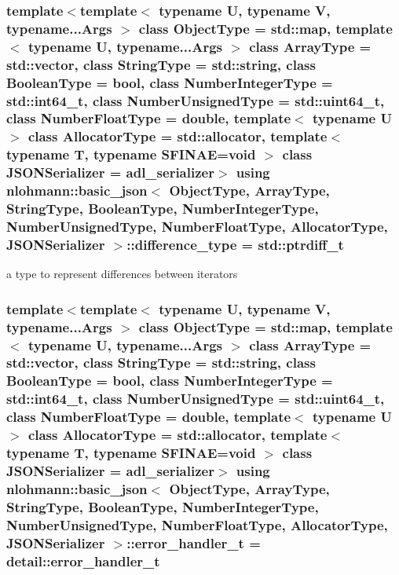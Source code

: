 \subsubsection[{\texorpdfstring{difference\+\_\+type}{difference_type}}]{\setlength{\rightskip}{0pt plus 5cm}template$<$template$<$ typename U, typename V, typename...\+Args $>$ class Object\+Type = std\+::map, template$<$ typename U, typename...\+Args $>$ class Array\+Type = std\+::vector, class String\+Type  = std\+::string, class Boolean\+Type  = bool, class Number\+Integer\+Type  = std\+::int64\+\_\+t, class Number\+Unsigned\+Type  = std\+::uint64\+\_\+t, class Number\+Float\+Type  = double, template$<$ typename U $>$ class Allocator\+Type = std\+::allocator, template$<$ typename T, typename S\+F\+I\+N\+A\+E=void $>$ class J\+S\+O\+N\+Serializer = adl\+\_\+serializer$>$ using {\bf nlohmann\+::basic\+\_\+json}$<$ Object\+Type, Array\+Type, String\+Type, Boolean\+Type, Number\+Integer\+Type, Number\+Unsigned\+Type, Number\+Float\+Type, Allocator\+Type, J\+S\+O\+N\+Serializer $>$\+::{\bf difference\+\_\+type} =  std\+::ptrdiff\+\_\+t}\hypertarget{classnlohmann_1_1basic__json_afe7c1303357e19cea9527af4e9a31d8f}{}\label{classnlohmann_1_1basic__json_afe7c1303357e19cea9527af4e9a31d8f}


a type to represent differences between iterators 

\subsubsection[{\texorpdfstring{error\+\_\+handler\+\_\+t}{error_handler_t}}]{\setlength{\rightskip}{0pt plus 5cm}template$<$template$<$ typename U, typename V, typename...\+Args $>$ class Object\+Type = std\+::map, template$<$ typename U, typename...\+Args $>$ class Array\+Type = std\+::vector, class String\+Type  = std\+::string, class Boolean\+Type  = bool, class Number\+Integer\+Type  = std\+::int64\+\_\+t, class Number\+Unsigned\+Type  = std\+::uint64\+\_\+t, class Number\+Float\+Type  = double, template$<$ typename U $>$ class Allocator\+Type = std\+::allocator, template$<$ typename T, typename S\+F\+I\+N\+A\+E=void $>$ class J\+S\+O\+N\+Serializer = adl\+\_\+serializer$>$ using {\bf nlohmann\+::basic\+\_\+json}$<$ Object\+Type, Array\+Type, String\+Type, Boolean\+Type, Number\+Integer\+Type, Number\+Unsigned\+Type, Number\+Float\+Type, Allocator\+Type, J\+S\+O\+N\+Serializer $>$\+::{\bf error\+\_\+handler\+\_\+t} =  {\bf detail\+::error\+\_\+handler\+\_\+t}}\hypertarget{classnlohmann_1_1basic__json_ae56b6bfbb1f6d2f43611f2ada4f9e5f2}{}\label{classnlohmann_1_1basic__json_ae56b6bfbb1f6d2f43611f2ada4f9e5f2}



